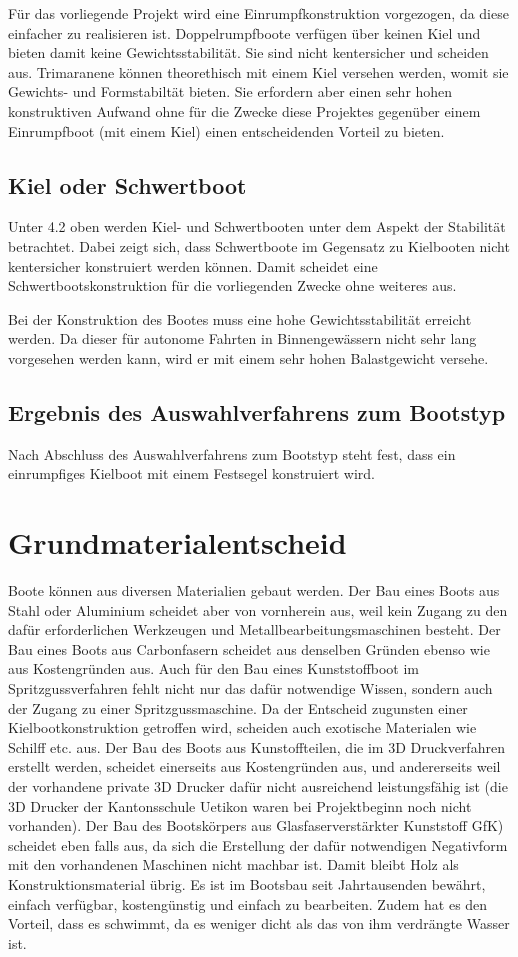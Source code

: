 Für das vorliegende Projekt wird eine Einrumpfkonstruktion vorgezogen, da diese einfacher zu realisieren ist. Doppelrumpfboote verfügen über keinen Kiel und bieten damit keine Gewichtsstabilität. Sie sind nicht kentersicher und scheiden aus. Trimaranene können theorethisch mit einem Kiel versehen werden, womit sie Gewichts- und Formstabiltät bieten. Sie erfordern aber einen sehr hohen konstruktiven Aufwand ohne für die Zwecke diese Projektes gegenüber einem Einrumpfboot (mit einem Kiel) einen entscheidenden Vorteil zu bieten. 
\subsection{Kiel oder Schwertboot}
Unter 4.2 oben werden Kiel- und Schwertbooten unter dem Aspekt der Stabilität betrachtet. Dabei zeigt sich, dass Schwertboote im Gegensatz zu Kielbooten nicht kentersicher konstruiert werden können. Damit scheidet eine Schwertbootskonstruktion für die vorliegenden Zwecke ohne weiteres aus.

Bei der Konstruktion des Bootes muss eine hohe Gewichtsstabilität erreicht werden. Da dieser für autonome Fahrten in Binnengewässern nicht sehr lang vorgesehen werden kann, wird er mit einem sehr hohen Balastgewicht versehe.  
\subsection{Ergebnis des Auswahlverfahrens zum Bootstyp}
Nach Abschluss des Auswahlverfahrens zum Bootstyp steht fest, dass ein einrumpfiges Kielboot mit einem Festsegel konstruiert wird.  
\section{Grundmaterialentscheid }
Boote können aus diversen Materialien gebaut werden. Der Bau eines Boots aus Stahl oder Aluminium scheidet aber von vornherein aus, weil kein Zugang zu den dafür erforderlichen Werkzeugen und Metallbearbeitungsmaschinen besteht. Der Bau eines Boots aus Carbonfasern scheidet aus denselben Gründen ebenso wie aus Kostengründen aus. Auch für den Bau eines Kunststoffboot im Spritzgussverfahren fehlt nicht nur das dafür notwendige Wissen, sondern auch der Zugang zu einer Spritzgussmaschine. Da der Entscheid zugunsten einer Kielbootkonstruktion getroffen wird, scheiden auch exotische Materialen wie Schilff etc. aus. Der Bau des Boots aus Kunstoffteilen, die im 3D Druckverfahren erstellt werden, scheidet einerseits aus Kostengründen aus, und andererseits weil der vorhandene private 3D Drucker dafür nicht ausreichend leistungsfähig ist (die 3D Drucker der Kantonsschule Uetikon waren bei Projektbeginn noch nicht vorhanden). Der Bau des Bootskörpers aus Glasfaserverstärkter Kunststoff GfK) scheidet eben falls aus, da sich die Erstellung der dafür notwendigen Negativform mit den vorhandenen Maschinen nicht machbar ist. Damit bleibt Holz als Konstruktionsmaterial übrig. Es ist im Bootsbau seit Jahrtausenden bewährt, einfach verfügbar, kostengünstig und einfach zu bearbeiten. Zudem hat es den Vorteil, dass es schwimmt, da es weniger dicht als das von ihm verdrängte Wasser ist.  

